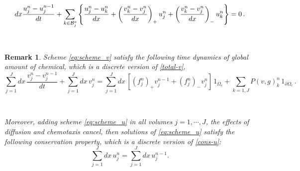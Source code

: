 \documentclass[11pt]{article}
\def \beq{\begin{equation}}
\def \eeq{\end{equation}}
\newtheorem{remark}[theorem]{Remark}
\numberwithin{theorem}{section}
\begin{document}
\beq\label{eq:scheme_u}
dx\frac{u_j^n-u_j^{n-1}}{dt}
+\sum_{k\in {\cal B}_j^o }  \left\{  \frac{u_{j}^n-u_k^{n}}{dx}
+\left(\frac{v_{k}^n-v_j^{n}}{dx}\right)_+u_j^n  +\left(\frac{v_{k}^n-v_j^{n}}{dx}\right)_-u_{k}^n \right\}=0 \,. 
\eeq

\

\begin{remark}

Scheme \eqref{eq:scheme_v} satisfy the following time dynamics of global amount of chemical, which is a discrete version of \eqref{total-v},
$$
\sum_{j=1}^J dx\, \frac{v_j^n - v_j^{n-1}}{dt} 
+\sum_{j=1}^J dx\, v_j^n 
= 
 \sum_{j=1}^J dx\, [(f^n_j)_+v^{n-1}_j+(f_j^n)_-v^n_j ]\, 1_{\Omega_c}
+ \sum_{k=1,J} P(v,g)^n_k \, 1_{\partial\Omega_c}\,.
$$

\

Moreover, adding scheme \eqref{eq:scheme_u} in all volumes $j=1,\cdots, J$, the effects of diffusion and chemotaxis cancel, then solutions of \eqref{eq:scheme_u} satisfy the following conservation property, which is a discrete version of  \eqref{cons-u}:
\begin{equation} \label{cons-u-dx}
\sum_{j=1}^J dx\, u_j^n = \sum_{j=1}^J dx\, u_j^{n-1} .
\end{equation}

\end{remark}


\
\end{document}
